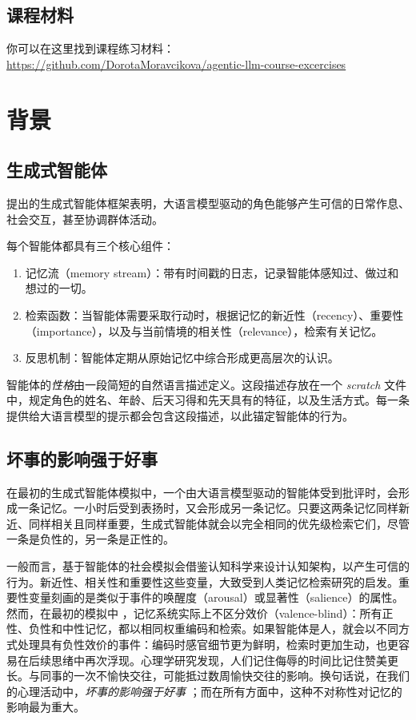 \subsection*{课程材料}
你可以在这里找到课程练习材料： \\
\url{https://github.com/DorotaMoravcikova/agentic-llm-course-excercises}




\section{背景}

\subsection{生成式智能体}

\citet{park2023generative} 提出的生成式智能体框架表明，大语言模型驱动的角色能够产生可信的日常作息、社会交互，甚至协调群体活动。

每个智能体都具有三个核心组件：
\begin{enumerate}
    \item 记忆流（memory stream）：带有时间戳的日志，记录智能体感知过、做过和想过的一切。
    \item 检索函数：当智能体需要采取行动时，根据记忆的新近性（recency）、重要性（importance），以及与当前情境的相关性（relevance），检索有关记忆。
    \item 反思机制：智能体定期从原始记忆中综合形成更高层次的认识。
\end{enumerate}

智能体的\textit{性格}由一段简短的自然语言描述定义。这段描述存放在一个 {\em scratch} 文件中，规定角色的姓名、年龄、后天习得和先天具有的特征，以及生活方式。每一条提供给大语言模型的提示都会包含这段描述，以此锚定智能体的行为。

\subsection{坏事的影响强于好事}

在最初的生成式智能体模拟中，一个由大语言模型驱动的智能体受到批评时，会形成一条记忆。一小时后受到表扬时，又会形成另一条记忆。只要这两条记忆同样新近、同样相关且同样重要，生成式智能体就会以完全相同的优先级检索它们，尽管一条是负性的，另一条是正性的。

一般而言，基于智能体的社会模拟会借鉴认知科学来设计认知架构，以产生可信的行为。新近性、相关性和重要性这些变量，大致受到人类记忆检索研究的启发。重要性变量刻画的是类似于事件的唤醒度（arousal）或显著性（salience）的属性。然而，在最初的模拟中 \citep{park2022social}，记忆系统实际上不区分效价（valence-blind）：所有正性、负性和中性记忆，都以相同权重编码和检索。如果智能体是人，就会以不同方式处理具有负性效价的事件：编码时感官细节更为鲜明，检索时更加生动，也更容易在后续思绪中再次浮现。心理学研究发现，人们记住侮辱的时间比记住赞美更长。与同事的一次不愉快交往，可能抵过数周愉快交往的影响。换句话说，在我们的心理活动中，{\em 坏事的影响强于好事} \citep{baumeister2001bad}；而在所有方面中，这种不对称性对记忆的影响最为重大。

